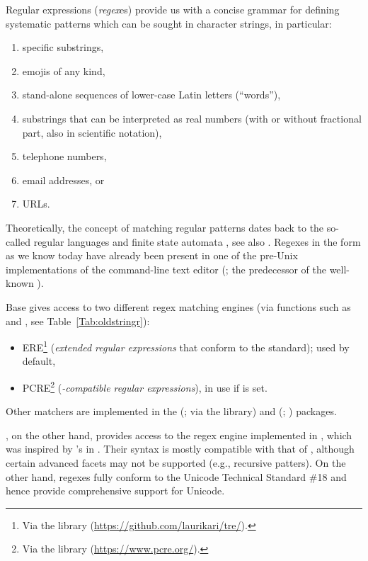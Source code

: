 \documentclass[nojss]{jss}\usepackage[]{graphicx}\usepackage[]{color}
\begin{document}
Regular expressions (\textit{regex}es) provide us with a concise
grammar for defining systematic patterns which can be sought in character
strings, in particular:
\begin{enumerate}
  \item specific substrings,
  \item emojis of any kind,
  \item stand-alone sequences of lower-case Latin letters (``words''),
  \item substrings that can be interpreted as real numbers
  (with or without fractional part, also in scientific notation),
  \item telephone numbers,
  \item email addresses, or
  \item URLs.
\end{enumerate}
Theoretically, the concept of matching regular patterns
dates back to the so-called regular languages and finite state
automata \citep{kleene},
see also \citep{hopcroftullman,automata}.
Regexes in the form as we know today have already been present
in one of the pre-Unix implementations of the command-line text
editor  (\citealp{qed}; the predecessor of the well-known ).

Base   gives access to two different regex matching engines
(via functions such as  and ,
see Table~\ref{Tab:oldstringr}):
\begin{itemize}
\item {ERE}\footnote{Via the  library
(\url{https://github.com/laurikari/tre/}).}
(\textit{extended regular expressions} that conform
to the  standard);
used by default,
\item {PCRE}\footnote{Via the 
library (\url{https://www.pcre.org/}).}
(\textit{-compatible regular expressions}),
in use if  is set.
\end{itemize}
Other matchers are implemented in the 
(\citealp{ore}; via the  library)
and  (\citealp{re2r}; ) packages.


, on the other hand, provides access to the regex engine
implemented in , which was inspired
by 's 
in . Their syntax is mostly compatible with that of ,
although certain advanced facets may not be supported (e.g., recursive
patters). On the other hand,  regexes fully conform to the
Unicode Technical Standard \#18 \citep{uts18:regex} and hence provide
comprehensive support for Unicode.
\end{document}
